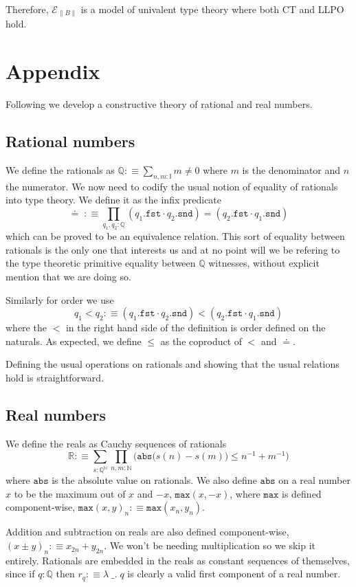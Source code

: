 \documentclass[12pt]{report}
\begin{document}
Therefore, $\mathcal{E}_{\lVert B \rVert}$ is a model of univalent type theory where both CT and LLPO hold.

\chapter*{Appendix}
Following \cite{bridges_richman_1987_2} we develop a constructive theory of rational and real numbers.
\section{Rational numbers}
We define the rationals as $\mathbb{Q} :\equiv \sum_{n,m: \mathbb{I}}m \neq 0$ where $m$ is the denominator and $n$ the numerator. 
We now need to codify the usual notion of equality of rationals into type theory. 
We define it as the infix predicate
$$\doteq\; :\equiv \prod_{q_1, q_2 : \mathbb{Q}} (q_1.\mathtt{fst} \cdot q_2.\mathtt{snd}) = (q_2.\mathtt{fst} \cdot q_1.\mathtt{snd})$$
which can be proved to be an equivalence relation. 
This sort of equality between rationals is the only one that interests us and at no point will we be refering to the type theoretic primitive equality between $\mathbb{Q}$ witnesses, without explicit mention that we are doing so. 

Similarly for order we use 
$$q_1 < q_2 :\equiv (q_1.\mathtt{fst} \cdot q_2.\mathtt{snd}) < (q_2.\mathtt{fst} \cdot q_1.\mathtt{snd})$$ 
where the $<$ in the right hand side of the definition is order defined on the naturals. 
As expected, we define $\leq$ as the coproduct of $<$ and $\doteq$. 

Defining the usual operations on rationals and showing that the usual relations hold is straightforward. 

\section{Real numbers}
We define the reals as Cauchy sequences of rationals
$$\mathbb{R} :\equiv \sum_{s: \mathbb{Q}^\mathbb{N}}\prod_{n,m : \mathbb{N}} \Big( \mathtt{abs}\big(s(n) - s(m) \big) \leq n^{-1} + m^{-1} \Big)$$
where $\mathtt{abs}$ is the absolute value on rationals. 
We also define $\mathtt{abs}$ on a real number $x$ to be the maximum out of $x$ and $-x$, $\mathtt{max}(x,-x)$, where $\mathtt{max}$ is defined component-wise, $\mathtt{max}(x,y)_n :\equiv \mathtt{max}(x_n,y_n)$. 

Addition and subtraction on reals are also defined component-wise, $(x \pm y)_n :\equiv x_{2n} + y_{2n}$. 
We won't be needing multiplication so we skip it entirely. 
Rationals are embedded in the reals as constant sequences of themselves, since if $q : \mathbb{Q}$ then $r_q :\equiv \lambda\;\_.\; q$ is clearly a valid first component of a real number. 
\end{document}
